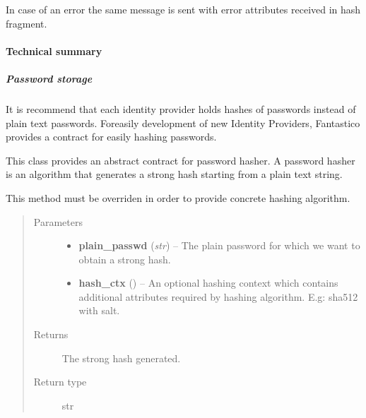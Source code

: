 \documentclass[letterpaper,10pt,english]{sphinxmanual}
\begin{document}
In case of an error the same message is sent with error attributes received in hash fragment.


\paragraph{Technical summary}
\label{features/oauth2/idp:technical-summary}

\subparagraph{Password storage}
\label{features/oauth2/idp:password-storage}
It is recommend that each identity provider holds hashes of passwords instead of plain text passwords. Foreasily development of
new Identity Providers, Fantastico provides a contract for easily hashing passwords.

\begin{fulllineitems}
\label{features/oauth2/idp:fantastico.oauth2.passwords_hasher.PasswordsHasher}
This class provides an abstract contract for password hasher. A password hasher is an algorithm that generates a strong
hash starting from a plain text string.

\begin{fulllineitems}
\label{features/oauth2/idp:fantastico.oauth2.passwords_hasher.PasswordsHasher.hash_password}
This method must be overriden in order to provide concrete hashing algorithm.
\begin{quote}\begin{description}
\item[{Parameters}] \leavevmode\begin{itemize}
\item {} 
\textbf{plain\_passwd} (\emph{str}) -- The plain password for which we want to obtain a strong hash.

\item {} 
\textbf{hash\_ctx} () -- An optional hashing context which contains additional attributes required by hashing algorithm. E.g: sha512 with salt.

\end{itemize}

\item[{Returns}] \leavevmode
The strong hash generated.

\item[{Return type}] \leavevmode
str

\end{description}\end{quote}

\end{fulllineitems}


\end{fulllineitems}
\end{document}
